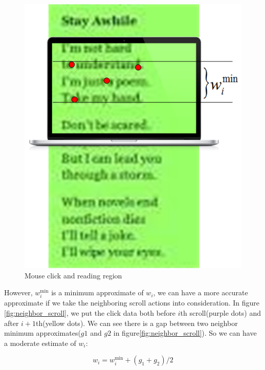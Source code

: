 \documentclass{sigchi}
\begin{document}
\begin{figure}[!h]
\centering
\includegraphics[width=0.7\columnwidth]{pictures/single_click}
\caption{Mouse click and reading region}
\label{fig:single_click}
\end{figure}


However, $w_i^{\min }$ is a minimum approximate of $w_i$, we can have a more accurate approximate if we take the neighboring 
scroll actions into consideration. In figure \ref{fig:neighbor_scroll}, we put the click data both before $i$th scroll(purple dots) and after $i+1$th(yellow dots).
We can see there is a gap between two neighbor minimum approximates($g1$ and $g2$ in figure\ref{fig:neighbor_scroll}). So we can have a moderate estimate of $w_i$:

\begin{equation} \label{eq:4}
{w_i} = w_i^{\min } + ({g_1} + {g_2})/2
\end{equation}
\end{document}
